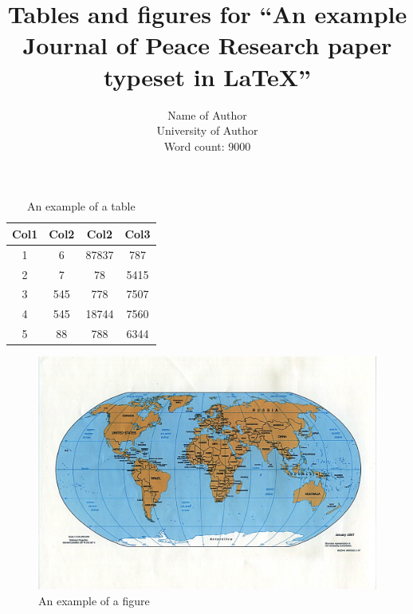 \documentclass[12pt,english]{article}
\title{Tables and figures for ``An example Journal of Peace Research paper typeset in \LaTeX''}
\author{Name of Author \\ University of Author \\ Word count: 9000}
\begin{document}

\maketitle

\newpage


\begin{table}[h!]
\caption{An example of a table}
\centering
\begin{tabular}{||c c c c||} 
 \hline
 Col1 & Col2 & Col2 & Col3 \\ [0.5ex] 
 \hline\hline
 1 & 6 & 87837 & 787 \\ 
 2 & 7 & 78 & 5415 \\
 3 & 545 & 778 & 7507 \\
 4 & 545 & 18744 & 7560 \\
 5 & 88 & 788 & 6344 \\ [1ex] 
 \hline
\end{tabular}
\label{table:1}
\end{table}


\begin{figure}[hbtp]
\caption{An example of a figure}
\centering
\includegraphics[scale=0.3]{world_map.jpg}
\end{figure}
\end{document}
